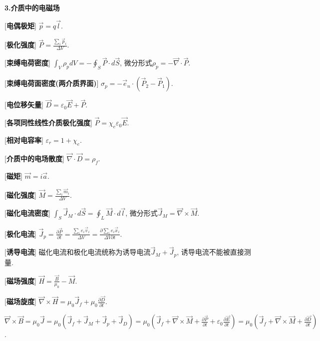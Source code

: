 \begin{center}
 \textbf{3.介质中的电磁场}
\end{center}

[\textbf{电偶极矩}] $\vec p=q\vec l$.\par

[\textbf{极化强度}] $\vec P=\frac{\sum\limits_i \vec p_i}{\Delta V}$.\par

[\textbf{束缚电荷密度}] $\int_V\rho_pdV=-\oint_S\vec P\cdot d\vec S$, 微分形式$\rho_p=-\vec\nabla\cdot\vec P$.\par

[\textbf{束缚电荷面密度(两介质界面)}] $\sigma_p=-\vec e_n\cdot (\vec P_2-\vec P_1)$.\par

[\textbf{电位移矢量}] $\vec D=\varepsilon_0\vec E+\vec P$.\par

[\textbf{各项同性线性介质极化强度}] $\vec P=\chi_e\varepsilon_0\vec E$.\par

[\textbf{相对电容率}] $\varepsilon_r=1+\chi_e$.\par

[\textbf{介质中的电场散度}] $\vec\nabla\cdot\vec D=\rho_f$.\par

[\textbf{磁矩}] $\vec m=i\vec a$.\par

[\textbf{磁化强度}] $\vec M=\frac{\sum\limits_i\vec m_i}{\Delta V}$.\par

[\textbf{磁化电流密度}] $\int_S\vec J_M\cdot d\vec S=\oint_L\vec M\cdot d\vec l$, 微分形式$\vec J_M=\vec\nabla\times\vec M$.\par

[\textbf{极化电流}] $\vec J_p=\frac{\partial \vec P}{\partial t}=\frac{\sum\limits_ie_i\vec v_i}{\Delta V}=\frac{\partial \sum\limits_i e_i\vec x_i}{\Delta V\partial t}$.\par

[\textbf{诱导电流}] 磁化电流和极化电流统称为诱导电流$\vec J_M+\vec J_p$, 诱导电流不能被直接测量.\par

[\textbf{磁场强度}] $\vec H=\frac{\vec B}{\mu_0}-\vec M$.\par

\clearpage

[\textbf{磁场旋度}] $\vec\nabla\times\vec H=\mu_0\vec J_f+\mu_0\frac{\partial \vec D}{\partial t}$.\par
\qquad $\vec\nabla\times\vec B=\mu_0\vec J=\mu_0(\vec J_f+\vec J_M+\vec J_p+\vec J_D)=\mu_0(\vec J_f+\vec\nabla\times\vec M+\frac{\partial \vec P}{\partial t}+\varepsilon_0\frac{\partial \vec E}{\partial t})=\mu_0(\vec J_f+\vec\nabla\times\vec M+\frac{\partial \vec D}{\partial t})$.\par

